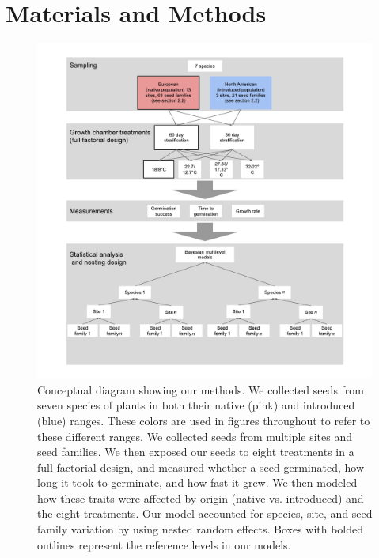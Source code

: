 \documentclass[11pt]{article}\usepackage[]{graphicx}\usepackage[]{color}
\begin{document}
	\section{Materials and Methods}
		\begin{figure} 
		\centering
		\includegraphics[scale=.65]{design}
		\caption{Conceptual diagram showing our methods. We collected seeds from seven species of plants in both their native (pink) and introduced (blue) ranges. These colors are used in figures throughout to refer to these different ranges. We collected seeds from multiple sites and seed families. We then exposed our seeds to eight treatments in a full-factorial design, and measured whether a seed germinated, how long it took to germinate, and how fast it grew. We then modeled how  these traits were affected by origin (native vs. introduced) and the eight treatments. Our model accounted for species, site, and seed family variation by using nested random effects. Boxes with bolded outlines represent the reference levels in our models. } %
		\label{fig:design}
	\end{figure}
\end{document}
